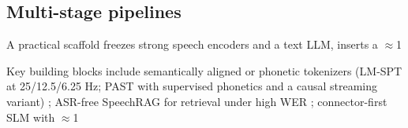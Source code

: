 \documentclass{article}
\begin{document}
\subsection{Multi-stage pipelines} \label{subsec:Multi-stage pipelines}
A practical scaffold freezes strong speech encoders and a text LLM, inserts a $\approx$1%

Key building blocks include semantically aligned or phonetic tokenizers (LM-SPT at 25/12.5/6.25 Hz; PAST with supervised phonetics and a causal streaming variant) \cite{jo2025lmsptalignedsemanticdistillationspeechto,har-tuv2025pastphoneticacousticspeechtokenizer}; ASR-free SpeechRAG for retrieval under high WER \cite{min2025speechretrievalaugmentedgenerationwithou}; connector-first SLM with $\approx$1%
\end{document}
